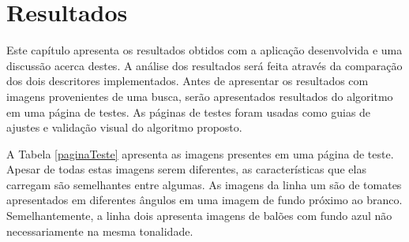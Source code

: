 \chapter{Resultados}

Este capítulo apresenta os resultados obtidos com a aplicação desenvolvida e uma discussão acerca destes. A análise dos resultados será feita através da comparação dos dois descritores implementados. Antes de apresentar os resultados com imagens provenientes de uma busca, serão apresentados resultados do algoritmo em uma página de testes. As páginas de testes foram usadas como guias de ajustes e validação visual do algoritmo proposto.

A Tabela \ref{paginaTeste} apresenta as imagens presentes em uma página de teste. Apesar de todas estas imagens serem diferentes, as características que elas carregam são semelhantes entre algumas. As imagens da linha um são de tomates apresentados em diferentes ângulos em uma imagem de fundo próximo ao branco. Semelhantemente, a linha dois apresenta imagens de balões com fundo azul não necessariamente na mesma tonalidade. 

